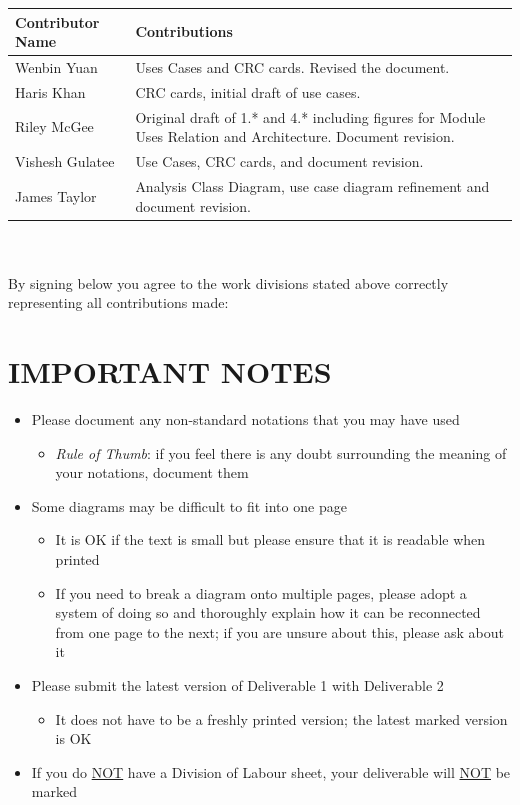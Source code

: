 \documentclass[]{article}
\begin{document}
\begin{tabular}{ | l | l | }
\hline
	\textbf{Contributor Name} & \textbf{Contributions}  \\
  	\hline
  	Wenbin Yuan & Uses Cases and CRC cards. Revised the document. \\
  	\hline
  	Haris Khan &  CRC cards, initial draft of use cases. \\
  	\hline
		Riley McGee & Original draft of 1.* and 4.* including figures for Module Uses Relation and Architecture. Document revision.\\
  	\hline
		Vishesh Gulatee & Use Cases, CRC cards, and document revision. \\
  	\hline
		James Taylor & Analysis Class Diagram, use case diagram refinement and document revision. \\
  	\hline
\end{tabular}
\\
\\
By signing below you agree to the work divisions stated above correctly representing all contributions made:



\newpage
\section*{IMPORTANT NOTES}
\begin{itemize}
	\item Please document any non-standard notations that you may have used
	\begin{itemize}
		\item \emph{Rule of Thumb}: if you feel there is any doubt surrounding the meaning of your notations, document them
	\end{itemize}
	\item Some diagrams may be difficult to fit into one page
	\begin{itemize}
		\item It is OK if the text is small but please ensure that it is readable when printed
		\item If you need to break a diagram onto multiple pages, please adopt a system of doing so and thoroughly explain how it can be reconnected from one page to the next; if you are unsure about this, please ask about it
	\end{itemize}
	\item Please submit the latest version of Deliverable 1 with Deliverable 2
	\begin{itemize}
		\item It does not have to be a freshly printed version; the latest marked version is OK
	\end{itemize}
	\item If you do \underline{NOT} have a Division of Labour sheet, your deliverable will \underline{NOT} be marked
\end{itemize}
\end{document}
